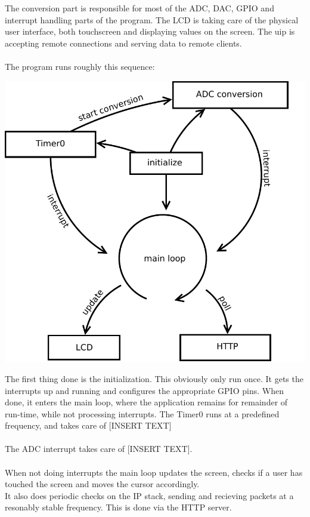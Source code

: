 The conversion part is responsible for most of the ADC, DAC, GPIO and interrupt handling parts of the program. The LCD is taking care of the physical user interface, both touchscreen and displaying values on the screen. The uip is accepting remote connections and serving data to remote clients.\\\\
The program runs roughly this sequence:
\begin{center}
\includegraphics[scale=0.4]{figs/program_sequence.pdf}
\end{center}
The first thing done is the initialization. This obviously only run once. It gets the interrupts up and running and configures the appropriate GPIO pins. When done, it enters the main loop, where the application remains for remainder of run-time, while not processing interrupts. The Timer0 runs at a predefined frequency, and takes care of [INSERT TEXT]\\\\

The ADC interrupt takes care of [INSERT TEXT].\\\\
When not doing interrupts the main loop updates the screen, checks if a user has touched the screen and moves the cursor accordingly.\\
It also does periodic checks on the IP stack, sending and recieving packets at a resonably stable frequency. This is done via the HTTP server.
